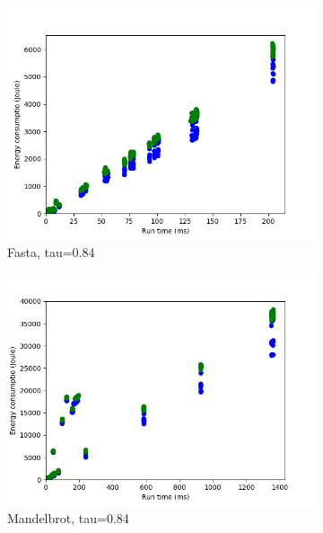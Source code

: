 \begin{figure}[h]
\begin{subfigure}[b]{0.45\textwidth}
        \includegraphics[width=\textwidth]{graphs/time-problem2.png}
        \caption{Fasta, tau=0.84}
        \label{fig:time2}
    \end{subfigure}
    \begin{subfigure}[b]{0.45\textwidth}
        \centering
        \includegraphics[width=\textwidth]{graphs/time-problem3.png}
        \caption{Mandelbrot, tau=0.84}
        \label{fig:time3}
    \end{subfigure}      
    \begin{subfigure}[b]{0.45\textwidth}
        \centering

\end{subfigure}
\end{figure}
